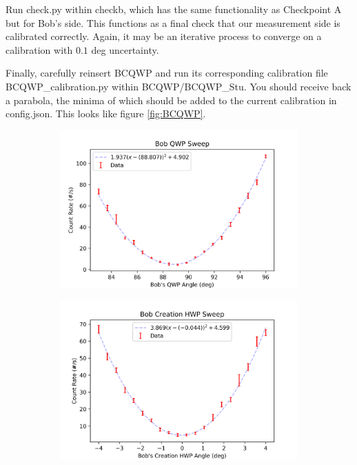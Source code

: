\documentclass{paper}[11pt]
\begin{document}
Run check.py within checkb, which has the same functionality as Checkpoint A but for Bob's side. This functions as a final check that our measurement side is calibrated correctly. Again, it may be an iterative process to converge on a calibration with $0.1$ deg uncertainty.

Finally, carefully reinsert BCQWP and run its corresponding calibration file BCQWP\_calibration.py within BCQWP/BCQWP\_Stu. You should receive back a parabola, the minima of which should be added to the current calibration in config.json. This looks like figure \ref{fig:BCQWP}.

\begin{figure}
    \centering
    \begin{subfigure}{0.35\linewidth}
        \centering
        \includegraphics[width=1\linewidth]{figs/BQWP_sweep0.png}
        \caption{}
        \label{fig:BQWP}
    \end{subfigure}
    \begin{subfigure}{0.35\linewidth}
        \centering
        \includegraphics[width=1\linewidth]{figs/BCHWP_sweep0.png}

\end{subfigure}
\end{figure}
\end{document}
